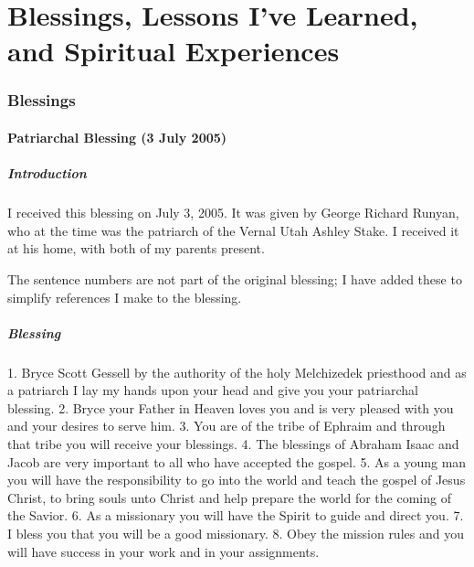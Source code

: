 \part{Blessings, Lessons I've Learned, and Spiritual Experiences}
	\label{LESSONS}
	
\section{Blessings} %
	\label{BLESSINGS}
	
	\subsection{Patriarchal Blessing (3 July 2005)}
		\label{BLESSINGS-PATRIARCHAL}
		
		\subsubsection{Introduction}
		
			I received this blessing on July 3, 2005. It was given by George Richard Runyan, who at the time was the patriarch of the Vernal Utah Ashley Stake. I received it at his home, with both of my parents present. 

			The sentence numbers are not part of the original blessing; I have added these to simplify references I make to the blessing.
		
		\subsubsection{Blessing}
		
			1. Bryce Scott Gessell by the authority of the holy Melchizedek priesthood and as a patriarch I lay my hands upon your head and give you your patriarchal blessing.
			2. Bryce your Father in Heaven loves you and is very pleased with you and your desires to serve him.
			3. You are of the tribe of Ephraim and through that tribe you will receive your blessings.
			4. The blessings of Abraham Isaac and Jacob are very important to all who have accepted the gospel.
			5. As a young man you will have the responsibility to go into the world and teach the gospel of Jesus Christ, to bring souls unto Christ and help prepare the world for the coming of the Savior.
			6. As a missionary you will have the Spirit to guide and direct you.
			7. I bless you that you will be a good missionary.
			8. Obey the mission rules and you will have success in your work and in your assignments.

